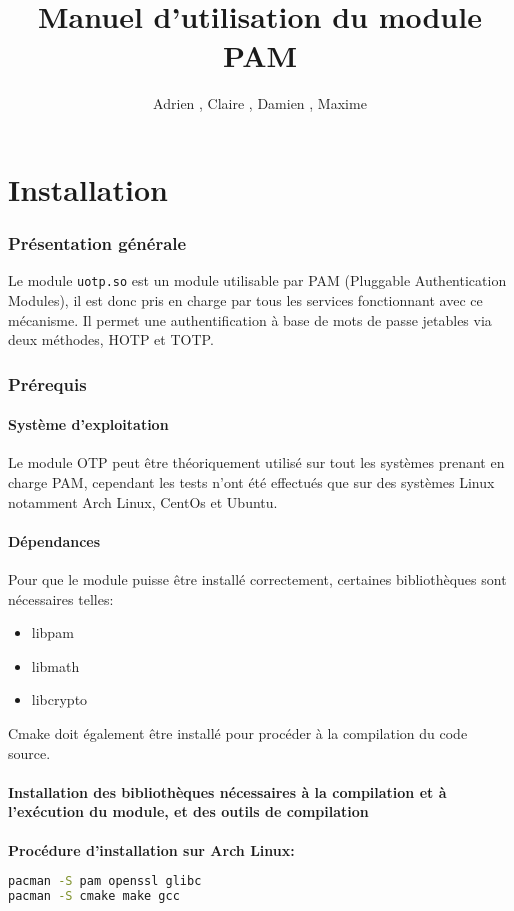 \documentclass{"../../../res/univ-projet"}
\title{Manuel d'utilisation du module PAM}
\author{Adrien \bsc{Smondack}, Claire \bsc{Hardouin}, Damien \bsc{Picard}, Maxime \bsc{Michotte}}
\begin{document}
\maketitle
\tableofcontents

\newpage

\part{Installation}
\section{Présentation générale}
Le module \verb?uotp.so? est un module utilisable par PAM (Pluggable Authentication Modules), 
il est donc pris en charge par tous les services fonctionnant avec ce mécanisme. Il permet 
une authentification à base de mots de passe jetables via deux méthodes, HOTP et TOTP.

\label{prereq}
\section{Prérequis}
\subsection{Système d'exploitation}
Le module OTP peut être théoriquement utilisé sur tout les systèmes prenant en charge PAM, cependant les tests n'ont été effectués
que sur des systèmes Linux notamment Arch Linux, CentOs et Ubuntu. 

\subsection{Dépendances}
Pour que le module puisse être installé correctement, certaines bibliothèques 
sont nécessaires telles:
\begin{itemize}
\item libpam
\item libmath
\item libcrypto
\end{itemize}
Cmake doit également être installé pour procéder à la compilation du code source.
\newline

\subsection{Installation des bibliothèques nécessaires à la compilation et à l'exécution du module, et des outils de compilation}
\textbf{Procédure d'installation sur Arch Linux:}\\
\begin{lstlisting}[language=bash, backgroundcolor=\color{black}, basicstyle=\color{white}]
pacman -S pam openssl glibc
pacman -S cmake make gcc
\end{lstlisting}
\end{document}
